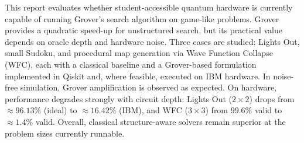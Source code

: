 
This report evaluates whether student-accessible quantum hardware is currently capable of running Grover’s search algorithm on game-like problems. Grover provides a quadratic speed-up for unstructured search, but its practical value depends on oracle depth and hardware noise. Three cases are studied: Lights Out, small Sudoku, and procedural map generation via Wave Function Collapse (WFC), each with a classical baseline and a Grover-based formulation implemented in Qiskit and, where feasible, executed on IBM hardware. In noise-free simulation, Grover amplification is observed as expected. On hardware, performance degrades strongly with circuit depth: Lights Out ($2\times2$) drops from $\approx96.13\%$ (ideal) to $\approx16.42\%$ (IBM), and WFC ($3\times3$) from $99.6\%$ valid to $\approx1.4\%$ valid. Overall, classical structure-aware solvers remain superior at the problem sizes currently runnable. 

